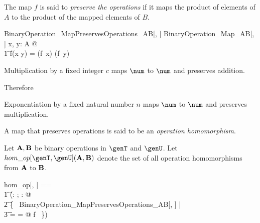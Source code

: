\documentclass{amsart}
\begin{document}
The map $f$ is said to {\em preserve the operations} if it maps the product of elements of $A$ to 
the product of the mapped elements of $B$.
\begin{schema}{BinaryOperation\_MapPreservesOperations\_AB}[\genT, \genU]
	BinaryOperation\_Map\_AB[\genT, \genU]
\where
	\forall x, y: A @ \\
	\t1	f(x \mulA y) = (f~x) \mulB (f~y)
\end{schema}

\begin{example}
Multiplication by a fixed integer $c$ maps $\num$ to $\num$ and preserves addition.

Therefore
\end{example}

\begin{example}
Exponentiation by a fixed natural number $n$ maps $\num$ to $\num$ and preserves multiplication.
\end{example}

A map that preserves operations is said to be an \textit{operation homomorphism}.

Let $\mathbf{A}, \mathbf{B}$ be binary operations in $\genT$ and $\genU$. 
Let $hom\_op[\genT, \genU](\strucA, \strucB)$ denote the set of all operation homomorphisms from $\mathbf{A}$ to $\mathbf{B}$.

\begin{zed}
	hom\_op[\genT, \genU] == \\
	\t1	(\lambda \alpha: \binop \genT; \beta: \binop \genU @ \\
	\t2		\{~ BinaryOperation\_MapPreservesOperations\_AB[\genT, \genU] | \\
	\t3			\alpha = \strucA \land \beta = \strucB @ f ~\})
\end{zed}
\end{document}
